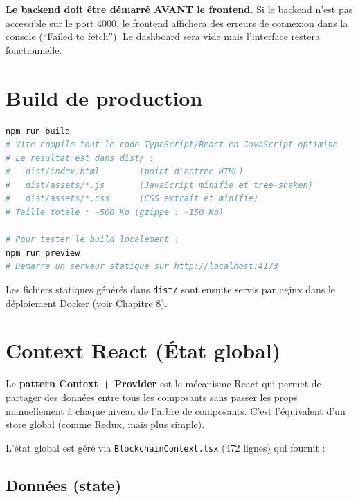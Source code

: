 \documentclass[12pt,a4paper,twoside]{report}
\begin{document}
\begin{warningbox}
\textbf{Le backend doit être démarré AVANT le frontend.} Si le backend n'est pas accessible sur le port 4000, le frontend affichera des erreurs de connexion dans la console (``Failed to fetch''). Le dashboard sera vide mais l'interface restera fonctionnelle.
\end{warningbox}

\section{Build de production}

\begin{lstlisting}[language=bash, caption=Build de production]
npm run build
# Vite compile tout le code TypeScript/React en JavaScript optimise
# Le resultat est dans dist/ :
#   dist/index.html        (point d'entree HTML)
#   dist/assets/*.js       (JavaScript minifie et tree-shaken)
#   dist/assets/*.css      (CSS extrait et minifie)
# Taille totale : ~500 Ko (gzippe : ~150 Ko)

# Pour tester le build localement :
npm run preview
# Demarre un serveur statique sur http://localhost:4173
\end{lstlisting}

Les fichiers statiques générés dans \texttt{dist/} sont ensuite servis par nginx dans le déploiement Docker (voir Chapitre 8).

\section{Context React (État global)}

Le \textbf{pattern Context + Provider} est le mécanisme React qui permet de partager des données entre tous les composants sans passer les props manuellement à chaque niveau de l'arbre de composants. C'est l'équivalent d'un store global (comme Redux, mais plus simple).

L'état global est géré via \texttt{BlockchainContext.tsx} (472 lignes) qui fournit :

\subsection{Données (state)}
\end{document}
